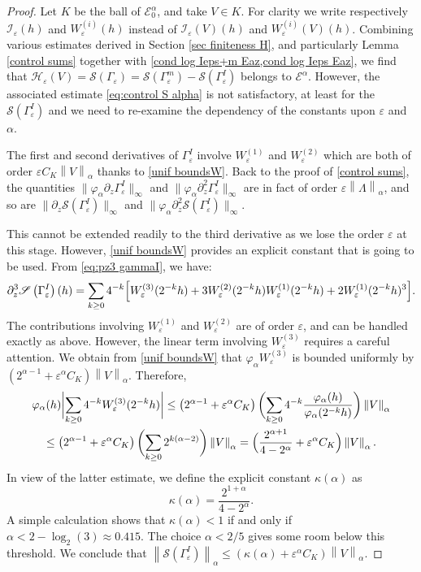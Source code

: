 \documentclass[JEP,XML,SOM,Unicode]{cedram}
\let\mathcal\mathscr
\newcommand{\cI}{\mathcal{I}}
\newcommand{\cS}{\mathcal{S}}
\theoremstyle{plain}
\theoremstyle{definition}
\renewcommand{\H}{\mathcal{H}_\eps}
\let\eps\varepsilon
\newcommand{\bbabs}[1]{\biggl\lvert#1\biggr\rvert}
\newcommand{\nalph}[1]{\left\lVert#1\right\rVert_\alpha}
\newcommand{\Ea}{\mathcal{E}^\alpha}
\newcommand{\Eaz}{\mathcal{E}^\alpha_0}
\newcommand{\Gammam}{\Gamma^m_{\eps}}
\newcommand{\GammaI}{\Gamma^I_{\eps}}
\newcommand{\vphia}{\varphi_\alpha}
\begin{document}
\begin{proof}
Let $K$ be the ball of $\Eaz$, and take $V \in K$. For clarity we write respectively $\cI_\eps(h) $ and $W_\eps^{(i)}(h)$ instead of $\cI_\eps(V) (h)$ and $W_\eps^{(i)}(V) (h)$. Combining various estimates derived in Section \ref{sec finiteness H}, and particularly Lemma \ref{control sums} together with \cref{cond log Ieps+m Eaz,cond log Ieps Eaz}, we find that $ \H(V) = \cS(\Gamma_\eps) = \cS(\Gammam) - \cS(\GammaI)$ belongs to $\Ea$. However, the associated estimate \eqref{eq:control S alpha} is not satisfactory, at least for the $\cS(\GammaI)$ and we need to re-examine the dependency of the constants upon $\eps$ and $\alpha$.

The first and second derivatives of $\GammaI$ involve $W_\eps^{(1)}$ and $W_\eps^{(2)}$ which are both of order $\eps C_K \nalph{V}$ thanks to \cref{unif boundsW}. Back to the proof of \cref{control sums}, the quantities $\|\vphia\partial_z \GammaI\|_{\infty} $ and $\|\vphia\partial_z^2 \GammaI\|_{\infty} $ are in fact of order $\eps \nalph{\Lambda}$, and so are $\| \partial_z\cS(\GammaI)\|_{\infty} $ and $\| \vphia\partial_z^2\cS(\GammaI)\|_{\infty} $.

This cannot be extended readily to the third derivative as we lose the order $\eps$ at this stage. However, \cref{unif boundsW} provides an explicit constant that is going to be used. From \eqref{eq:pz3 gammaI}, we have:
\begin{equation*}
\partial^3_z \cS \left(\GammaI \right)(h) = \sum_{k \geq 0} 4^{-k} \Bigl[W_\eps^{(3)}(2^{-k}h)+3W_\eps^{(2)}(2^{-k}h)W_\eps^{(1)}(2^{-k}h)+2W_\eps^{(1)}(2^{-k}h)^3 \Bigr].
\end{equation*}
The contributions involving $W^{(1)}_\eps$ and $W^{(2)}_\eps$ are of order $\eps$, and can be handled exactly as above. However, the linear term involving $W_\eps^{(3)}$ requires a careful attention. We obtain from \cref{unif boundsW} that $\vphia W_\eps^{(3)}$ is bounded uniformly by $\left(2^{\alpha-1} + \eps^\alpha C_K \right) \nalph{V}$. Therefore,
\begin{multline}\label{eq:contraction kappa}
\vphia(h) \bbabs{ \sum_{k\geq 0} 4^{-k}W^{(3)}_\eps(2^{-k}h) }
\leq \left(2^{\alpha-1} + \eps^\alpha C_K \right) \biggl (\sum_{k \geq 0} 4^{-k} \dfrac{\vphia(h)}{\vphia(2^{-k}h)} \biggr) \nalph{V} \\
\leq
\left(2^{\alpha-1} + \eps^\alpha C_K \right) \biggl (\sum_{k \geq 0} 2^{k(\alpha - 2)} \biggr) \nalph{V} =
\Bigl(\dfrac{2^{\alpha+1}}{4 - 2^\alpha} + \eps^\alpha C_K \Bigr) \nalph{V}.
\end{multline}
In view of the latter estimate, we define the explicit constant $\kappa(\alpha)$ as
\begin{equation*}
\kappa(\alpha) = \dfrac{2^{1+\alpha}}{4-2^\alpha}.
\end{equation*}
A simple calculation shows that $\kappa(\alpha)<1$ if and only if $\alpha < 2 - \log_2(3) \approx 0.415$.
The choice $\alpha < 2/5$ gives some room below this threshold. We conclude that $\nalph{\cS(\GammaI)}\leq (\kappa(\alpha)+\eps^\alpha C_K)\nalph{V}$.


\end{proof}
\end{document}
